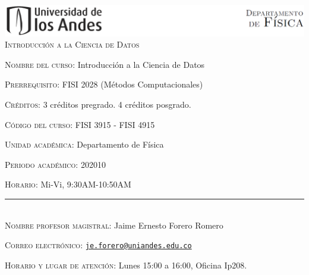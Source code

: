\documentclass[letterpaper,10pt,onecolumn]{article}
\begin{document}
\begin{center}

\includegraphics[width=490pt]{header.png}\\[0.5cm]

\textsc{\LARGE Introducci\'on a la Ciencia de Datos}\\[0.1cm]

\end{center}

\large \noindent\textsc{Nombre del curso:}  Introducci\'on a la Ciencia de Datos%
  
\noindent\textsc{Prerrequisito:} FISI 2028 (M\'etodos Computacionales)%

\noindent\textsc{Cr\'editos:} 3 cr\'editos pregrado. 4 cr\'editos posgrado. %

\noindent\textsc{C\'odigo del curso:} FISI 3915 - FISI 4915 %

\noindent\textsc{Unidad acad\'emica:} Departamento de F\'isica

\noindent\textsc{Periodo acad\'emico:} 202010 %

\noindent\textsc{Horario:} Mi-Vi, 9:30AM-10:50AM



\noindent\rule{\textwidth}{1pt}\\[-0.3cm]

\normalsize \noindent\textsc{Nombre profesor magistral:}
Jaime Ernesto Forero Romero%

\noindent\textsc{Correo electr\'onico:}
\href{mailto:je.forero@uniandes.edu.co}{\nolinkurl{je.forero@uniandes.edu.co}}

\noindent\textsc{Horario y lugar de atenci\'on:}  Lunes 15:00 a 16:00, Oficina Ip208.

\end{document}

